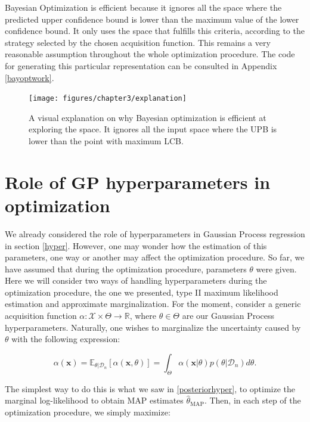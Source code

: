 \documentclass[10pt,a4paper,twoside]{book}
\begin{document}
Bayesian Optimization is efficient because it ignores all the space where the predicted upper confidence bound is lower than the maximum value of the lower confidence bound. It only uses the space that fulfills this criteria, according to the strategy selected by the chosen acquisition function. This remains a very reasonable assumption throughout the whole optimization procedure. The code for generating this particular representation can be consulted in Appendix \ref{bayoptwork}.

\begin{figure}
	\caption{A visual explanation on why Bayesian optimization is efficient at exploring the space. It ignores all the input space where the UPB is lower than the point with maximum LCB.}
	\label{fig:explanation}
	\texttt{[image: figures/chapter3/explanation]}
\end{figure}


\section{Role of GP hyperparameters in optimization}

We already considered the role of hyperparameters in Gaussian Process regression in section \ref{hyper}. However, one may wonder how the estimation of this parameters, one way or another may affect the optimization procedure. So far, we have assumed that during the optimization procedure, parameters $\theta$ were given. Here we will consider two ways of handling hyperparameters during the optimization procedure, the one we presented, type II maximum likelihood estimation and approximate marginalization. For the moment, consider a generic acquisition function $\alpha:\mathcal{X} \times \Theta \rightarrow \mathbb{R}$, where $\theta \in \Theta$ are our Gaussian Process hyperparameters. Naturally, one wishes to marginalize the uncertainty caused by $\theta$ with the following expression:

\begin{equation}
\alpha(\boldsymbol{x}) = \mathbb{E}_{\theta|\mathcal{D}_n}\left[ \alpha(\boldsymbol{x}, \theta) \right] = \int_{\Theta} \alpha(\boldsymbol{x}|\theta)p(\theta|\mathcal{D}_n)d\theta.
\end{equation}

The simplest way to do this is what we saw in \ref{posteriorhyper}, to optimize the marginal log-likelihood to obtain MAP estimates $\hat{\theta}_{\mathrm{MAP}}$. Then, in each step of the optimization procedure, we simply maximize:
\end{document}
